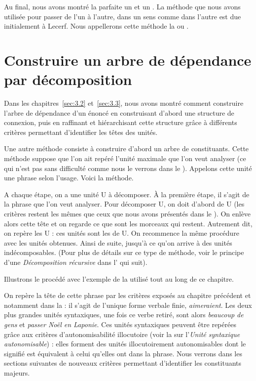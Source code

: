 Au final, nous avons montré la parfaite  un  et un . La méthode que nous avons utilisée pour passer de l’un à l’autre, dans un sens comme dans l’autre est due initialement à Lecerf. Nous appellerons cette méthode la  ou .

\section{Construire un arbre de dépendance par décomposition}\label{sec:3.4.6}\largerpage

Dans les chapitres~\ref{sec:3.2} et~\ref{sec:3.3}, nous avons montré comment construire l’arbre de dépendance d’un énoncé en construisant d’abord une structure de connexion, puis en raffinant et hiérarchisant cette structure grâce à différents critères permettant d’identifier les têtes des unités.

Une autre méthode consiste à construire d’abord un arbre de constituants. Cette méthode suppose que l’on ait repéré l’unité maximale que l’on veut analyser (ce qui n'est pas sans difficulté comme nous le verrons dans le ). Appelons cette unité une phrase selon l’usage. Voici la méthode.

A chaque étape, on a une unité U à décomposer. À la première étape, il s’agit de la phrase que l’on veut analyser. Pour décomposer U, on doit d’abord  de U (les critères restent les mêmes que ceux que nous avons présentés dans le ). On enlève alors cette tête et on regarde ce que sont les morceaux qui restent. Autrement dit, on repère les   U : ces unités sont les  de U. On recommence la même procédure avec les unités obtenues. Ainsi de suite, jusqu’à ce qu’on arrive à des unités indécomposables. (Pour plus de détails sur ce type de méthode, voir le principe d’une \textit{Décomposition récursive} dans l’ qui suit).\largerpage[-1]

Illustrons le procédé avec l’exemple  de la  utilisé tout au long de ce chapitre.

On repère la tête de cette phrase par les critères exposés au chapitre précédent et notamment dans la  : il s’agit de l’unique forme verbale finie, \textit{aimeraient}. Les deux plus grandes unités syntaxiques, une fois ce verbe retiré, sont alors \textit{beaucoup de gens} et \textit{passer Noël en Laponie}. Ces unités syntaxiques peuvent être repérées grâce aux critères d’autonomisabilité illocutoire (voir la  sur l'\textit{Unité syntaxique autonomisable}) : elles forment des unités illocutoirement autonomisables dont le signifié est équivalent à celui qu’elles ont dans la phrase. Nous verrons dans les sections suivantes de nouveaux critères permettant d’identifier les constituants majeurs.

